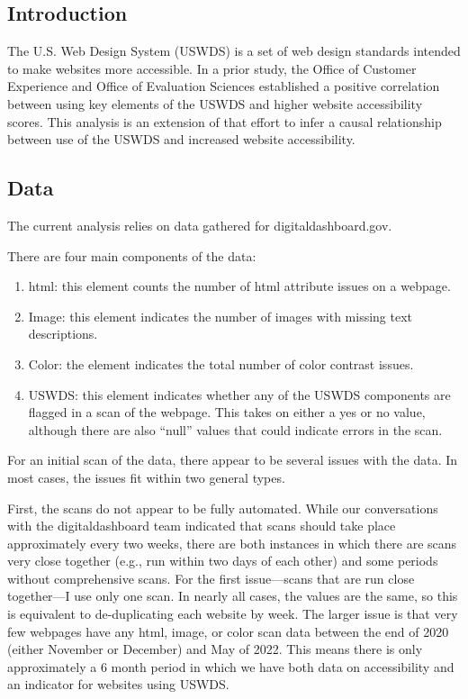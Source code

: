 \documentclass[
]{article}
\providecommand{\tightlist}{%
  \setlength{\itemsep}{0pt}\setlength{\parskip}{0pt}}
\begin{document}
\hypertarget{introduction}{%
\subsection{Introduction}\label{introduction}}

The U.S. Web Design System (USWDS) is a set of web design standards
intended to make websites more accessible. In a prior study, the Office
of Customer Experience and Office of Evaluation Sciences established a
positive correlation between using key elements of the USWDS and higher
website accessibility scores. This analysis is an extension of that
effort to infer a causal relationship between use of the USWDS and
increased website accessibility.

\hypertarget{data}{%
\subsection{Data}\label{data}}

The current analysis relies on data gathered for digitaldashboard.gov.

There are four main components of the data:

\begin{enumerate}
\def\labelenumi{\arabic{enumi}.}
\tightlist
\item
  html: this element counts the number of html attribute issues on a
  webpage.
\item
  Image: this element indicates the number of images with missing text
  descriptions.
\item
  Color: the element indicates the total number of color contrast
  issues.
\item
  USWDS: this element indicates whether any of the USWDS components are
  flagged in a scan of the webpage. This takes on either a yes or no
  value, although there are also ``null'' values that could indicate
  errors in the scan.
\end{enumerate}

For an initial scan of the data, there appear to be several issues with
the data. In most cases, the issues fit within two general types.

First, the scans do not appear to be fully automated. While our
conversations with the digitaldashboard team indicated that scans should
take place approximately every two weeks, there are both instances in
which there are scans very close together (e.g., run within two days of
each other) and some periods without comprehensive scans. For the first
issue---scans that are run close together---I use only one scan. In
nearly all cases, the values are the same, so this is equivalent to
de-duplicating each website by week. The larger issue is that very few
webpages have any html, image, or color scan data between the end of
2020 (either November or December) and May of 2022. This means there is
only approximately a 6 month period in which we have both data on
accessibility and an indicator for websites using USWDS.
\end{document}
